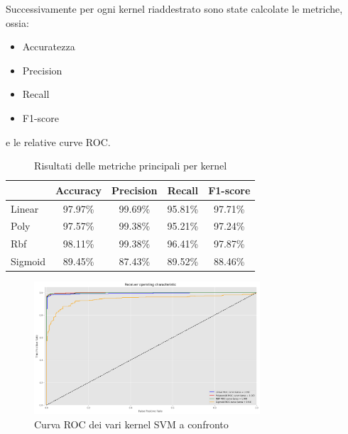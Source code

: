 Successivamente per ogni kernel riaddestrato sono state calcolate
le metriche, ossia:
\begin{itemize}
    \item Accuratezza
    \item Precision
    \item Recall
    \item F1-score
\end{itemize}
e le relative curve ROC.

\begin{table}[!ht]
    \centering
    \begin{tabular}{@{}lcccc@{}}
        \toprule
        \rowcolor[HTML]{EFEFEF}
        \multicolumn{1}{c}{\cellcolor[HTML]{EFEFEF}\textbf{kernel}} & \textbf{Accuracy} & \textbf{Precision} & \textbf{Recall} & \textbf{F1-score} \\ \midrule
        Linear                                                      & 97.97\%           & 99.69\%            & 95.81\%         & 97.71\%           \\
        Poly                                                        & 97.57\%           & 99.38\%            & 95.21\%         & 97.24\%           \\
        Rbf                                                         & 98.11\%           & 99.38\%            & 96.41\%         & 97.87\%           \\
        Sigmoid                                                     & 89.45\%           & 87.43\%            & 89.52\%         & 88.46\%           \\ \bottomrule
    \end{tabular}
    \caption{Risultati delle metriche principali per kernel}
    \label{tab:top_metrics_kernels_corr}
\end{table}
\begin{figure}[!ht]
    \centering
    \includegraphics[width=0.75\textwidth]{img/svm/roc_SVM.png}
    \caption{Curva ROC dei vari kernel SVM a confronto}
    \label{fig:roc_SVM_corr}
\end{figure}
\newpage

